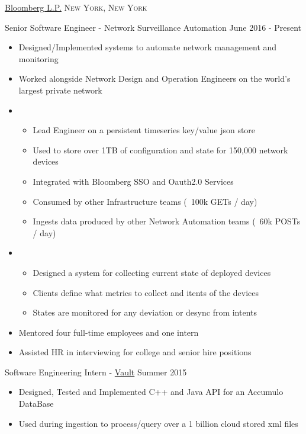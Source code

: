 \documentclass[11pt]{article}
\begin{document}
\headedsection  %
{\href{http://www.bloomberg.com/company}{Bloomberg L.P.}}
{\textsc{New York, New York}}
{
    \headedsubsection
    {Senior Software Engineer - Network Surveillance Automation}
    {June 2016 - Present}
    {
        \begin{itemize}
            \item Designed/Implemented systems to automate network management and monitoring
            \item Worked alongside Network Design and Operation Engineers on the world's largest private network
            \item{}
            { \begin{itemize}
                \item Lead Engineer on a persistent timeseries key/value json store
                \item Used to store over 1TB of configuration and state for 150,000 network devices
                \item Integrated with Bloomberg SSO and Oauth2.0 Services
                \item Consumed by other Infrastructure teams (~100k GETs / day)
                \item Ingests data produced by other Network Automation teams (~60k POSTs / day)
                \end{itemize} }
            \item{}
            { \begin{itemize}
                \item Designed a system for collecting current state of deployed devices
                \item Clients define what metrics to collect and itents of the devices
                \item States are monitored for any deviation or desync from intents
                \end{itemize} }
            \item Mentored four full-time employees and one intern
            \item Assisted HR in interviewing for college and senior hire positions
        \end{itemize}

    }
}
\headedsection  %
{}
{}
{
    \headedsubsection
    {Software Engineering Intern - \href{https://www.bloomberg.com/professional/product/vault/}{Vault}}
    {Summer 2015}
    {
        \begin{itemize}
            \item Designed, Tested and Implemented C++ and Java API for an Accumulo DataBase
            \item Used during ingestion to process/query over a 1 billion cloud stored xml files
        \end{itemize}
    }
}
\end{document}
